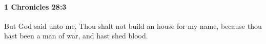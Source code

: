 
		\paragraph{1 Chronicles 28:3} %
			\label{1CHRONICLES-28-3}

			But God said unto me, Thou shalt not build an house for my name, because thou hast been a man of war, and hast shed blood.


